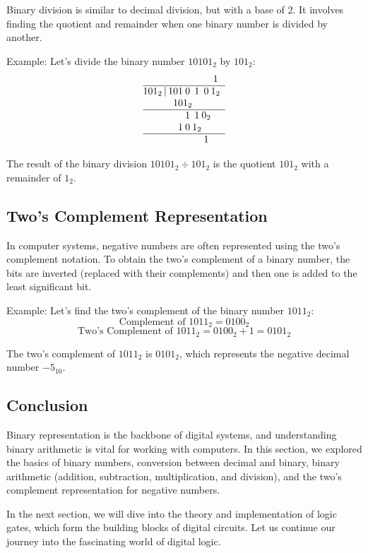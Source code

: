 \documentclass{article}
\begin{document}
Binary division is similar to decimal division, but with a base of 2. It involves finding the quotient and remainder when one binary number is divided by another.

Example: Let's divide the binary number $10101_2$ by $101_2$:
\[
\begin{array}{@{}r@{}c@{}c@{}c@{}c@{}c@{}c}
            & & & & & & 1 \\
\hline
101_2 \,|\, 1 & 0 & 1 & 0 & 1 & 0 & 1_2 \\
            & 1 & 0 & 1_2 & \\
\hline
            & & & 1 & 1 & 0_2 & \\
            & & 1 & 0 & 1_2 & \\
\hline
            & & & & & 1 & \\
\end{array}
\]

The result of the binary division $10101_2 \div 101_2$ is the quotient $101_2$ with a remainder of $1_2$.

\subsection{Two's Complement Representation}

In computer systems, negative numbers are often represented using the two's complement notation. To obtain the two's complement of a binary number, the bits are inverted (replaced with their complements) and then one is added to the least significant bit.

Example: Let's find the two's complement of the binary number $1011_2$:
\[ \text{Complement of } 1011_2 = 0100_2 \]
\[ \text{Two's Complement of } 1011_2 = 0100_2 + 1 = 0101_2 \]

The two's complement of $1011_2$ is $0101_2$, which represents the negative decimal number $-5_{10}$.

\subsection{Conclusion}

Binary representation is the backbone of digital systems, and understanding binary arithmetic is vital for working with computers. In this section, we explored the basics of binary numbers, conversion between decimal and binary, binary arithmetic (addition, subtraction, multiplication, and division), and the two's complement representation for negative numbers.

In the next section, we will dive into the theory and implementation of logic gates, which form the building blocks of digital circuits. Let us continue our journey into the fascinating world of digital logic.
\end{document}
